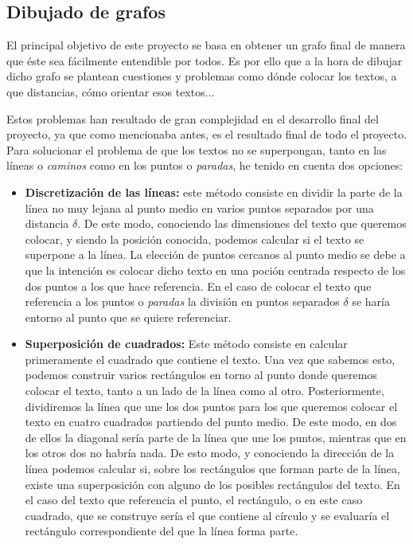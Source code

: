 \subsection{Dibujado de grafos}
El principal objetivo de este proyecto se basa en obtener un grafo final de manera que éste sea fácilmente entendible por todos. Es por ello que a la hora de dibujar dicho grafo se plantean cuestiones y problemas como dónde colocar los textos, a que distancias, cómo orientar esos textos$\dots$

Estos problemas han resultado de gran complejidad en el desarrollo final del proyecto, ya que como mencionaba antes, es el resultado final de todo el proyecto. Para solucionar el problema de que los textos no se superpongan, tanto en las líneas o \textit{caminos} como en los puntos o \textit{paradas}, he tenido en cuenta dos opciones:
\begin{itemize}
	\item \textbf{Discretización de las líneas:} este método consiste en dividir la parte de la línea no muy lejana al punto medio en varios puntos separados por una distancia $\delta$. De este modo, conociendo las dimensiones del texto que queremos colocar, y siendo la posición conocida, podemos calcular si el texto se superpone a la línea. La elección de puntos cercanos al punto medio se debe a que la intención es colocar dicho texto en una poción centrada respecto de los dos puntos a los que hace referencia. En el caso de colocar el texto que referencia a los puntos o \textit{paradas} la división en puntos separados $\delta$ se haría entorno al punto que se quiere referenciar.
	\item \textbf{Superposición de cuadrados:} Este método consiste en calcular primeramente el cuadrado que contiene el texto. Una vez que sabemos esto, podemos construir varios rectángulos en torno al punto donde queremos colocar el texto, tanto a un lado de la línea como al otro. Posteriormente, dividiremos la línea que une los dos puntos para los que queremos colocar el texto en cuatro cuadrados partiendo del punto medio. De este modo, en dos de ellos la diagonal sería parte de la línea que une los puntos, mientras que en los otros dos no habría nada. De esto modo, y conociendo la dirección de la línea podemos calcular si, sobre los rectángulos que forman parte de la línea, existe una superposición con alguno de los posibles rectángulos del texto. En el caso del texto que referencia el punto, el rectángulo, o en este caso cuadrado, que se construye sería el que contiene al círculo y se evaluaría el rectángulo correspondiente del que la línea forma parte.
\end{itemize}

